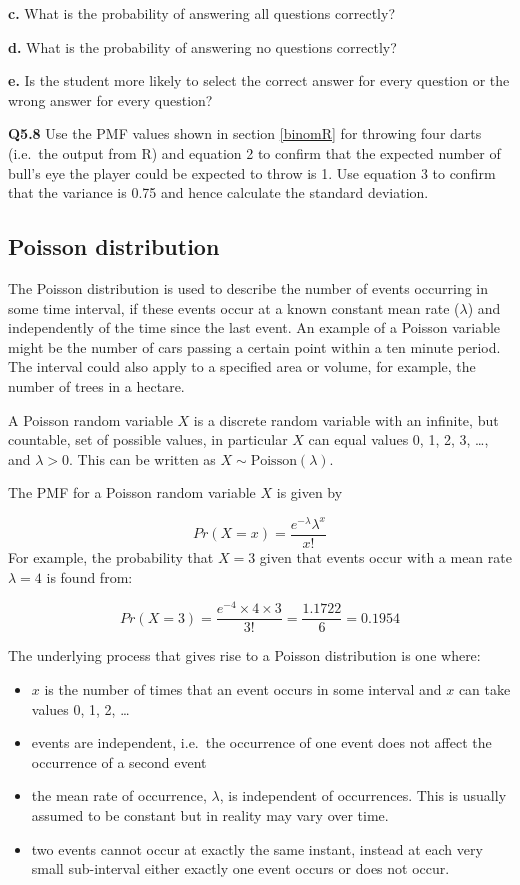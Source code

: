 \documentclass[
  oneside]{krantz}
\providecommand{\tightlist}{%
  \setlength{\itemsep}{0pt}\setlength{\parskip}{0pt}}
\begin{document}
\textbf{c.} What is the probability of answering all questions correctly?

\textbf{d.} What is the probability of answering no questions correctly?

\textbf{e.} Is the student more likely to select the correct answer for every question or the wrong answer for every question?

\textbf{Q5.8} Use the PMF values shown in section \ref{binomR} for throwing four darts (i.e.~the output from R) and equation 2 to confirm that the expected number of bull's eye the player could be expected to throw is 1. Use equation 3 to confirm that the variance is 0.75 and hence calculate the standard deviation.

\hypertarget{poisdist}{%
\subsection{Poisson distribution}\label{poisdist}}

The Poisson distribution is used to describe the number of events occurring in some time interval, if these events occur at a known constant mean rate (\(\lambda\)) and independently of the time since the last event. An example of a Poisson variable might be the number of cars passing a certain point within a ten minute period. The interval could also apply to a specified area or volume, for example, the number of trees in a hectare.

A Poisson random variable \(X\) is a discrete random variable with an infinite, but countable, set of possible values, in particular \(X\) can equal values 0, 1, 2, 3, \ldots, and \(\lambda > 0\). This can be written as \(X \sim \textrm{Poisson}(\lambda)\).

The PMF for a Poisson random variable \(X\) is given by

\[ Pr(X=x) = \frac{e^{-\lambda}\lambda^x}{x!}\]
For example, the probability that \(X=3\) given that events occur with a mean rate \(\lambda=4\) is found from:

\[ Pr(X=3) = \frac{e^{-4} \times 4 \times 3}{3!} = \frac{1.1722}{6} = 0.1954\]

The underlying process that gives rise to a Poisson distribution is one where:

\begin{itemize}
\tightlist
\item
  \(x\) is the number of times that an event occurs in some interval and \(x\) can take values 0, 1, 2, \ldots{}
\item
  events are independent, i.e.~the occurrence of one event does not affect the occurrence of a second event
\item
  the mean rate of occurrence, \(\lambda\), is independent of occurrences. This is usually assumed to be constant but in reality may vary over time.
\item
  two events cannot occur at exactly the same instant, instead at each very small sub-interval either exactly one event occurs or does not occur.
\end{itemize}
\end{document}
